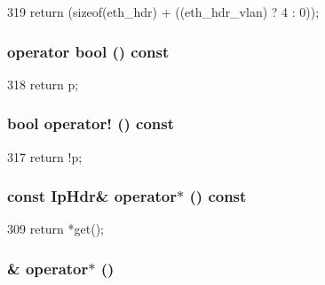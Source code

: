 \begin{DoxyCode}
319 { return (sizeof(eth_hdr) + ((eth_hdr_vlan) ? 4 : 0)); }
\end{DoxyCode}
\hypertarget{classNet_1_1IpPtr_aa385aa18f5e42db5a415c25a90f4193d}{
\subsubsection[{operator bool}]{\setlength{\rightskip}{0pt plus 5cm}operator bool () const}}
\label{classNet_1_1IpPtr_aa385aa18f5e42db5a415c25a90f4193d}



\begin{DoxyCode}
318 { return p; }
\end{DoxyCode}
\hypertarget{classNet_1_1IpPtr_ac8b1d32dbd52d431450c70b151cfa205}{
\subsubsection[{operator!}]{\setlength{\rightskip}{0pt plus 5cm}bool operator! () const}}
\label{classNet_1_1IpPtr_ac8b1d32dbd52d431450c70b151cfa205}



\begin{DoxyCode}
317 { return !p; }
\end{DoxyCode}
\hypertarget{classNet_1_1IpPtr_a304f52e91f52d5f6971631f4a7dda56c}{
\subsubsection[{operator$\ast$}]{\setlength{\rightskip}{0pt plus 5cm}const {\bf IpHdr}\& operator$\ast$ () const}}
\label{classNet_1_1IpPtr_a304f52e91f52d5f6971631f4a7dda56c}



\begin{DoxyCode}
309 { return *get(); }
\end{DoxyCode}
\hypertarget{classNet_1_1IpPtr_af7ec99d1e439b4734cca731edef84bdc}{
\subsubsection[{operator$\ast$}]{\& operator$\ast$ ()}}
\label{classNet_1_1IpPtr_af7ec99d1e439b4734cca731edef84bdc}



